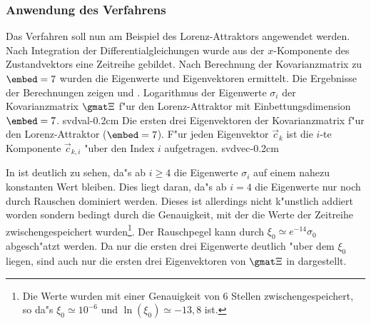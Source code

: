 \subsubsection{Anwendung des Verfahrens}
Das Verfahren soll nun am Beispiel des Lorenz-Attraktors angewendet werden.  Nach
Integration der Differentialgleichungen wurde aus der $x$-Komponente des Zustandvektors
eine Zeitreihe gebildet.  Nach Berechnung der Kovarianzmatrix zu $\embed=7$ wurden die
Eigenwerte und Eigenvektoren ermittelt.  Die Ergebnisse der Berechnungen zeigen
 und .
{Logarithmus der Eigenwerte $\sigma_i$ der Kovarianzmatrix $\gmat \Xi$ f"ur den
Lorenz-Attraktor mit Einbettungsdimension $\embed=7$.
}
{svdval}{-0.2cm}
{Die ersten drei Eigenvektoren der Kovarianzmatrix f"ur den Lorenz-Attraktor
($\embed=7$). F"ur jeden Eigenvektor $\vec c_k$ ist die $i$-te Komponente
$\vec c_{k,i}$ "uber den Index $i$ aufgetragen.}
{svdvec}{-0.2cm}

In  ist deutlich zu sehen, da"s ab $i\geq 4$ die Eigenwerte $\sigma_i$ auf
einem nahezu konstanten Wert bleiben. Dies liegt daran, da"s ab $i=4$ die Eigenwerte nur
noch durch Rauschen dominiert werden. Dieses ist allerdings nicht k"unstlich addiert
worden sondern bedingt durch die Genauigkeit, mit der die Werte der Zeitreihe
zwischengespeichert wurden\footnote{Die Werte wurden mit einer Genauigkeit von 6 Stellen
zwischengespeichert, so da"s $\xi_0\simeq 10^{-6}$ und $\ln(\xi_0)\simeq -13,8$ ist.}. 
Der Rauschpegel kann durch $\xi_0\simeq e^{-14}\sigma_0$ abgesch"atzt werden.
Da nur die ersten drei Eigenwerte deutlich "uber dem $\xi_0$ liegen, sind auch nur die
ersten drei Eigenvektoren von $\gmat\Xi$ in 
dargestellt. 

